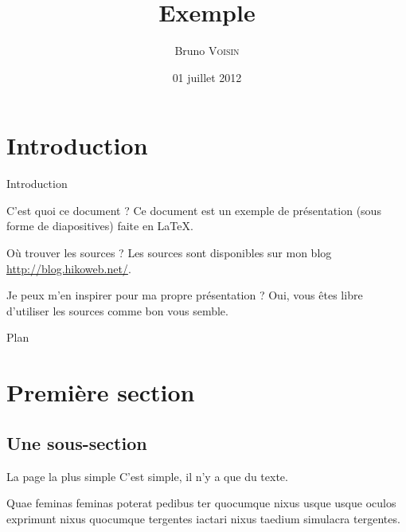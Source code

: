 \documentclass[utf8,compress]{beamer}
\title{Exemple}
\subtitle{\slidesubject}
\author{Bruno \textsc{Voisin}}
\institute{
    Université de \LaTeX\\
    Entreprise\\
    \vspace{0.8em}
    \emph{- Responsables -} \\
    M.~Maitre \textsc{Destage}\\
    M.~En \textsc{Cadran}
}
\date{01 juillet 2012}
\begin{document}
\begin{frame}
\titlepage
\end{frame}



\section{Introduction}

\begin{frame}{Introduction}
\begin{block}{C'est quoi ce document ?}
    Ce document est un exemple de présentation (sous forme de diapositives) faite en LaTeX.
\end{block}
\begin{block}{Où trouver les sources ?}
    Les sources sont disponibles sur mon blog \url{http://blog.hikoweb.net/}.
\end{block}
\begin{block}{Je peux m'en inspirer pour ma propre présentation ?}
    Oui, vous êtes libre d'utiliser les sources comme bon vous semble.
\end{block}
\end{frame}

\begin{frame}{Plan}
\tableofcontents
\end{frame}



\section{Première section}

\subsection{Une sous-section}

\begin{frame}{La page la plus simple}
C'est simple, il n'y a que du texte.

Quae feminas feminas poterat pedibus ter quocumque nixus usque usque oculos exprimunt nixus quocumque tergentes iactari nixus taedium simulacra tergentes.
\end{frame}
\end{document}
